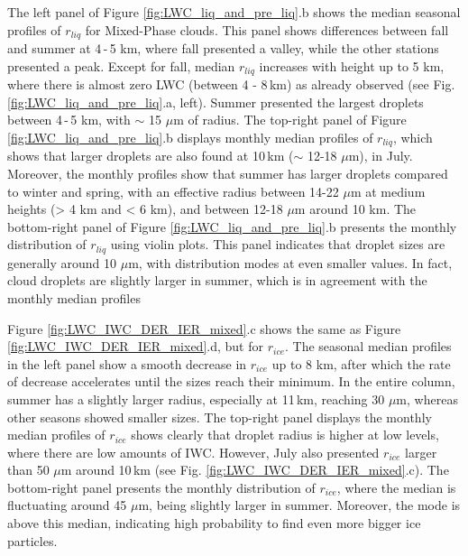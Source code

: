 
The left panel of Figure \ref{fig:LWC_liq_and_pre_liq}.b shows the median seasonal profiles of $r_{liq}$ for Mixed-Phase clouds. This panel shows differences between fall and summer at 4\,-\,5 km, where fall presented a valley, while the other stations presented a peak. Except for fall, median $r_{liq}$ increases with height up to 5 km, where there is almost zero LWC (between 4 - 8\,km) as already observed (see Fig. \ref{fig:LWC_liq_and_pre_liq}.a, left). Summer presented the largest droplets between 4\,-\,5 km, with $\sim$ 15 $\mu$m of radius. The top-right panel of Figure \ref{fig:LWC_liq_and_pre_liq}.b displays monthly median profiles of $r_{liq}$, which shows that larger droplets are also found at 10\,km ($\sim$ 12-18 $\mu$m), in July. Moreover, the monthly profiles show that summer has larger droplets compared to winter and spring, with an effective radius between 14-22 $\mu$m at medium heights (> 4 km and < 6 km), and between 12-18 $\mu$m around 10 km. The bottom-right panel of Figure \ref{fig:LWC_liq_and_pre_liq}.b presents the monthly distribution of $r_{liq}$ using violin plots. This panel indicates that droplet sizes are generally around 10 $\mu$m, with distribution modes at even smaller values. In fact, cloud droplets are slightly larger in summer, which is in agreement with the monthly median profiles



Figure \ref{fig:LWC_IWC_DER_IER_mixed}.c shows the same as Figure \ref{fig:LWC_IWC_DER_IER_mixed}.d, but for $r_{ice}$. 
The seasonal median profiles in the left panel show a smooth decrease in $r_{ice}$ up to 8 km, after which the rate of decrease accelerates until the sizes reach their minimum. In the entire column, summer has a slightly larger radius, especially at 11\,km, reaching 30 $\mu$m, whereas other seasons showed smaller sizes. The top-right panel displays the monthly median profiles of $r_{ice}$ shows clearly that droplet radius is higher at low levels, where there are low amounts of IWC. However, July also presented $r_{ice}$ larger than 50 $\mu$m around 10\,km (see Fig. \ref{fig:LWC_IWC_DER_IER_mixed}.c). The bottom-right panel presents the monthly distribution of $r_{ice}$, where the median is fluctuating around 45 $\mu$m, being slightly larger in summer. Moreover, the mode is above this median, indicating high probability to find even more bigger ice particles.

